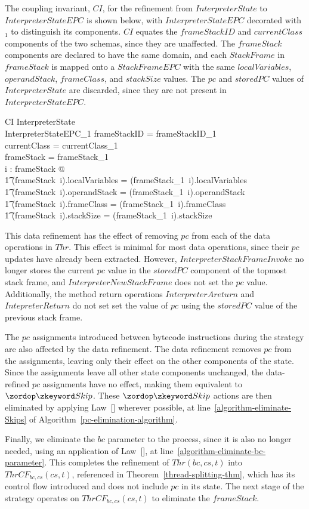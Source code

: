 The coupling invariant, $CI$, for the refinement from
$InterpreterState$ to $InterpreterStateEPC$ is shown below, with
$InterpreterStateEPC$ decorated with ${}_1$ to distinguish its
components.
$CI$ equates the $frameStackID$ and $currentClass$ components of the
two schemas, since they are unaffected.
The $frameStack$ components are declared to have the same domain, and
each $StackFrame$ in $frameStack$ is mapped onto a $StackFrameEPC$
with the same $localVariables$, $operandStack$, $frameClass$, and
$stackSize$ values.
The $pc$ and $storedPC$ values of $InterpreterState$ are discarded,
since they are not present in $InterpreterStateEPC$.
\begin{schema}{CI}
  InterpreterState \\
  InterpreterStateEPC_1
\where
  frameStackID = frameStackID_1 \\
  currentClass = currentClass_1 \\
  \dom frameStack = \dom frameStack_1 \\
  \forall i : \dom frameStack @ \\
  \t1 (frameStack~i).localVariables = (frameStack_1~i).localVariables \land \\
  \t1 (frameStack~i).operandStack = (frameStack_1~i).operandStack \land \\
  \t1 (frameStack~i).frameClass = (frameStack_1~i).frameClass \land \\
  \t1 (frameStack~i).stackSize = (frameStack_1~i).stackSize
\end{schema}

This data refinement has the effect of removing $pc$ from each of the
data operations in $Thr$.
This effect is minimal for most data operations, since their $pc$
updates have already been extracted. 
However, $InterpreterStackFrameInvoke$ no longer stores the current
$pc$ value in the $storedPC$ component of the topmost stack frame, and
$InterpreterNewStackFrame$ does not set the $pc$ value.
Additionally, the method return operations $InterpreterAreturn$ and
$IntepreterReturn$ do not set set the value of $pc$ using the
$storedPC$ value of the previous stack frame.

The $pc$ assignments introduced between bytecode instructions during
the strategy are also affected by the data refinement.
The data refinement removes $pc$ from the assignments, leaving only
their effect on the other components of the state.
Since the assignments leave all other state components unchanged, the
data-refined $pc$ assignments have no effect, making them equivalent
to $\Skip$.
These $\Skip$ actions are then eliminated by applying
Law~[] wherever possible, at
line~\ref{algorithm-eliminate-Skips} of
Algorithm~\ref{pc-elimination-algorithm}.

Finally, we eliminate the $bc$ parameter to the process, since it is
also no longer needed, using an application of
Law~[], at
line~\ref{algorithm-eliminate-bc-parameter}.
This completes the refinement of $Thr(bc,cs,t)$ into
$ThrCF_{bc,cs}(cs,t)$, referenced in
Theorem~\ref{thread-splitting-thm}, which has its control flow
introduced and does not include $pc$ in its state.
The next stage of the strategy operates on $ThrCF_{bc,cs}(cs,t)$ to
eliminate the $frameStack$.
